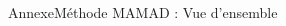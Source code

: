 \begin{frame}{Annexe}{Méthode MAMAD : Vue d’ensemble}
\begin{columns}
        \begin{column}{0.4\textwidth}
            \centering
        \end{column}

    \end{columns}

\end{frame}


